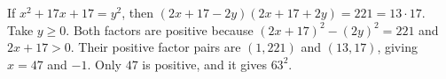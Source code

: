 If $x^2+17x+17=y^2$, then $(2x+17-2y)(2x+17+2y)=221=13\cdot17$. Take $y\ge0$. Both factors are positive because $(2x+17)^2-(2y)^2=221$ and $2x+17>0$. Their positive factor pairs are $(1,221)$ and $(13,17)$, giving $x=47$ and $-1$. Only $\boxed{47}$ is positive, and it gives $63^2$.
